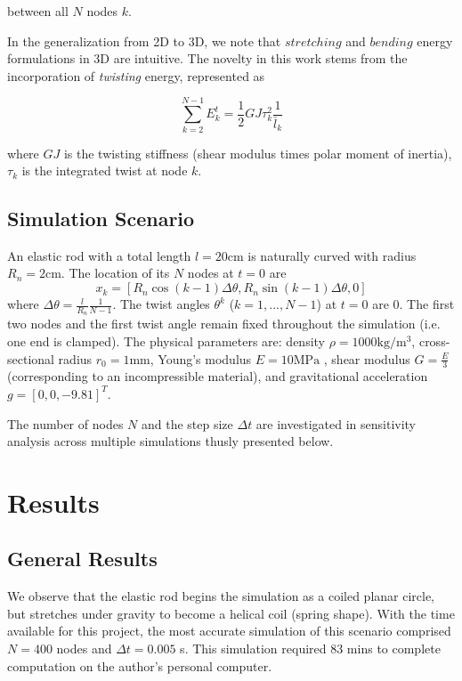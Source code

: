 \documentclass[letterpaper, 10 pt, conference]{ieeeconf}  %
\begin{document}
between all $N$ nodes $k$.

In the generalization from 2D to 3D, we note that $stretching$ and $bending$ energy formulations in 3D are intuitive.
The novelty in this work stems from the incorporation of \textit{twisting} energy, represented as

\begin{equation}
   \sum^{N-1}_{k=2}E^t_k = \frac{1}{2} GJ \tau^2_k \frac{1}{\bar{l}_k}
\end{equation}

where $GJ$ is the twisting stiffness (shear modulus times polar moment of inertia), $\tau_k$ is the integrated twist at node $k$.


\subsection{Simulation Scenario}

An elastic rod with a total length $l = 20 \text{cm}$ is naturally curved with radius $R_n = 2 \text{cm}$.
The location of its $N$ nodes at $t=0$ are
$$
   x_k = [R_n \cos{(k-1) \Delta \theta}, R_n \sin{(k-1) \Delta \theta}, 0]
$$
where $\Delta \theta = \frac{l}{R_n} \frac{1}{N-1}$.
The twist angles $\theta^k$ ($k=1, ..., N-1$) at $t=0$ are 0.
The first two nodes and the first twist angle remain fixed throughout the simulation (i.e. one end is clamped).
The physical parameters are: density $\rho = 1000 \text{kg}/\text{m}^3$, cross-sectional radius $r_0 = 1 \text{mm}$, Young's modulus $E = 10 \text{MPa}$ , shear modulus $G = \frac{E}{3}$ (corresponding to an incompressible material), and gravitational acceleration $g = [0, 0, -9.81]^T$.

The number of nodes $N$ and the step size $\Delta t$ are investigated in sensitivity analysis across multiple simulations thusly presented below.

\section{Results}

\subsection{General Results}

We observe that the elastic rod begins the simulation as a coiled planar circle, but stretches under gravity to become a helical coil (spring shape).
With the time available for this project, the most accurate simulation of this scenario comprised $N=400$ nodes and $\Delta t = 0.005$ s.
This simulation required 83 mins to complete computation on the author's personal computer.
\end{document}
